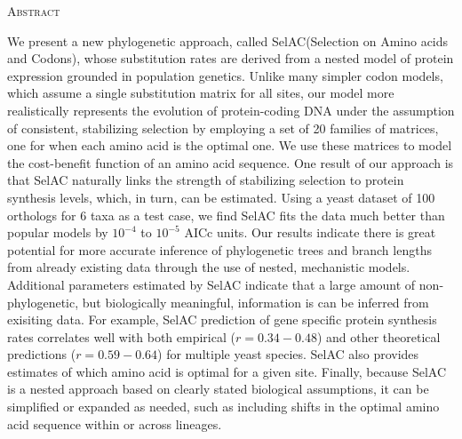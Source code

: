 \documentclass[12pt,letterpaper,fleqn]{article}
\renewcommand{\section}[1]{%
\bigskip
\begin{center}
\begin{Large}
\normalfont\scshape #1
\medskip
\end{Large}
\end{center}}
\newcommand{\selac}{SelAC\xspace}
\begin{document}


\newpage

\section{Abstract}
We present a new phylogenetic approach, called \selac (Selection on Amino acids and Codons), whose substitution rates are derived from a nested model of protein expression grounded in population genetics.
Unlike many simpler codon models, which assume a single substitution matrix for all sites, our model more realistically represents the evolution of protein-coding DNA under the assumption of consistent, stabilizing selection by employing a set of 20 families of matrices, one for when each amino acid is the optimal one.
We use these matrices to model the cost-benefit function of an amino acid sequence.
One result of our approach is that \selac naturally links the strength of stabilizing selection to protein synthesis levels, which, in turn, can be estimated.
Using a yeast dataset of 100 orthologs for 6 taxa as a test case, we find \selac fits the data much better than popular models by $10^{-4}$ to $10^{-5}$ AICc units.
Our results indicate there is great potential for more accurate inference of phylogenetic trees and branch lengths from already existing data through the use of nested, mechanistic models.
Additional parameters estimated by \selac indicate that a large amount of non-phylogenetic, but biologically meaningful, information is can be inferred from exisiting data.
For example, \selac prediction of gene specific protein synthesis rates correlates well with both empirical ($r = 0.34-0.48$) and other theoretical predictions ($r=0.59-0.64$) for multiple yeast species.
\selac also provides estimates of which amino acid is optimal for a given site.
Finally, because SelAC is a nested approach based on clearly stated biological assumptions, it can be simplified or expanded as needed, such as including shifts in the optimal amino acid sequence within or across lineages.
\newpage
\end{document}
